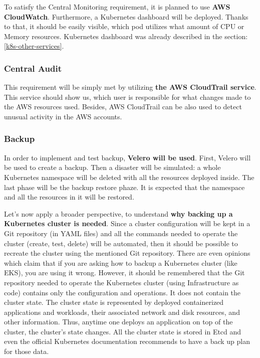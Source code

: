 To satisfy the Central Monitoring requirement, it is planned to use \textbf{AWS CloudWatch}. Furthermore, a Kubernetes dashboard will be deployed. Thanks to that, it should be easily visible, which pod utilizes what amount of CPU or Memory resources. Kubernetes dashboard was already described in the section: \ref{k8s-other-services}.

\subsubsection{Central Audit}

This requirement will be simply met by utilizing \textbf{the AWS CloudTrail service}. This service should show us, which user is responsible for what changes made to the AWS resources used. Besides, AWS CloudTrail can be also used to detect unusual activity in the AWS accounts\cite{online-ct}.

\subsubsection{Backup}

In order to implement and test backup, \textbf{Velero will be used}. First, Velero will be used to create a backup. Then a disaster will be simulated: a whole Kubernetes namespace will be deleted with all the resources deployed inside. The last phase will be the backup restore phaze. It is expected that the namespace and all the resources in it will be restored\cite{eksworkshop-backup}\cite{velero-examples}.

Let's now apply a broader perspective, to understand \textbf{why backing up a Kubernetes cluster is needed}. Since a cluster configuration will be kept in a Git repository (in YAML files) and all the commands needed to operate the cluster (create, test, delete) will be automated, then it should be possible to recreate the cluster using the mentioned Git repository. There are even opinions which claim that if you are asking how to backup a Kubernetes cluster (like EKS), you are using it wrong\cite{reddit-on-backup}. However, it should be remembered that the Git repository needed to operate the Kubernetes cluster (using Infrastructure as code) contains only the configuration and operations. It does not contain the cluster state. The cluster state is represented by deployed containerized applications and workloads, their associated network and disk resources, and other information\cite{k8s-concepts}. Thus, anytime one deploys an application on top of the cluster, the cluster's state changes. All the cluster state is stored in Etcd and even the official Kubernetes documentation recommends to have a back up plan for those data\cite{k8s-components}.

